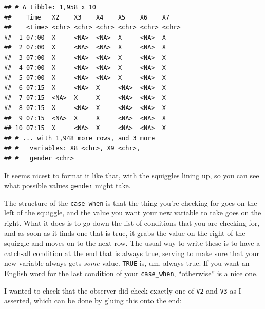 \documentclass[]{tufte-book}
\newenvironment{Shaded}{}{}
\newcommand{\DataTypeTok}[1]{\textcolor[rgb]{0.56,0.13,0.00}{#1}}
\newcommand{\KeywordTok}[1]{\textcolor[rgb]{0.00,0.44,0.13}{\textbf{#1}}}
\newcommand{\NormalTok}[1]{#1}
\newcommand{\OperatorTok}[1]{\textcolor[rgb]{0.40,0.40,0.40}{#1}}
\newcommand{\OtherTok}[1]{\textcolor[rgb]{0.00,0.44,0.13}{#1}}
\newcommand{\StringTok}[1]{\textcolor[rgb]{0.25,0.44,0.63}{#1}}
\theoremstyle{definition}
\theoremstyle{definition}
\theoremstyle{definition}
\theoremstyle{remark}
\begin{document}
\begin{verbatim}
## # A tibble: 1,958 x 10
##    Time   X2    X3    X4    X5    X6    X7   
##    <time> <chr> <chr> <chr> <chr> <chr> <chr>
##  1 07:00  X     <NA>  <NA>  X     <NA>  X    
##  2 07:00  X     <NA>  <NA>  X     <NA>  X    
##  3 07:00  X     <NA>  <NA>  X     <NA>  X    
##  4 07:00  X     <NA>  <NA>  X     <NA>  X    
##  5 07:00  X     <NA>  <NA>  X     <NA>  X    
##  6 07:15  X     <NA>  X     <NA>  <NA>  X    
##  7 07:15  <NA>  X     X     <NA>  <NA>  X    
##  8 07:15  X     <NA>  X     <NA>  <NA>  X    
##  9 07:15  <NA>  X     X     <NA>  <NA>  X    
## 10 07:15  X     <NA>  X     <NA>  <NA>  X    
## # ... with 1,948 more rows, and 3 more
## #   variables: X8 <chr>, X9 <chr>,
## #   gender <chr>
\end{verbatim}

It seems nicest to format it like that, with the squiggles lining up, so
you can see what possible values \texttt{gender} might take.

The structure of the \texttt{case\_when} is that the thing you're
checking for goes on the left of the squiggle, and the value you want
your new variable to take goes on the right. What it does is to go down
the list of conditions that you are checking for, and as soon as it
finds one that is true, it grabs the value on the right of the squiggle
and moves on to the next row. The usual way to write these is to have a
catch-all condition at the end that is always true, serving to make sure
that your new variable always gets \emph{some} value. \texttt{TRUE} is,
um, always true. If you want an English word for the last condition of
your \texttt{case\_when}, ``otherwise'' is a nice one.

I wanted to check that the observer did check exactly one of \texttt{V2}
and \texttt{V3} as I asserted, which can be done by gluing this onto the
end:

\begin{Shaded}
\end{Shaded}
\end{document}
